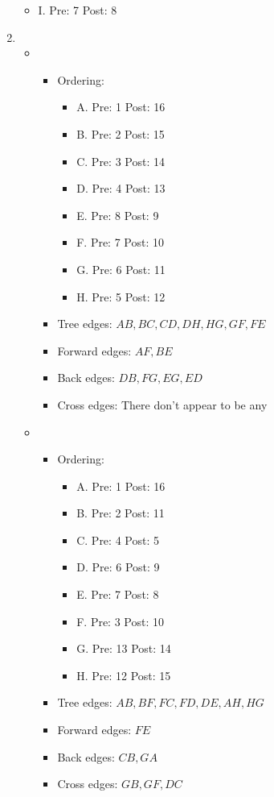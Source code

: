 \documentclass{article}
\begin{document}
\begin{enumerate}
\begin{itemize}
            \item I. Pre: 7 Post: 8
        \end{itemize}
        \item \begin{itemize}
            \item \begin{itemize}
                \item Ordering: \begin{itemize}
                \item A. Pre: 1 Post: 16
                \item B. Pre: 2 Post: 15
                \item C. Pre: 3 Post: 14
                \item D. Pre: 4 Post: 13
                \item E. Pre: 8 Post: 9 
                \item F. Pre: 7 Post: 10
                \item G. Pre: 6 Post: 11
                \item H. Pre: 5 Post: 12
                \end{itemize}
                \item Tree edges: $AB, BC, CD, DH, HG, GF, FE$
                \item Forward edges: $AF, BE$
                \item Back edges: $DB, FG, EG, ED$
                \item Cross edges: There don't appear to be any
            \end{itemize}
            \item \begin{itemize}
                \item Ordering: \begin{itemize}
                \item A. Pre: 1 Post: 16
                \item B. Pre: 2 Post: 11
                \item C. Pre: 4 Post: 5
                \item D. Pre: 6 Post: 9
                \item E. Pre: 7 Post: 8 
                \item F. Pre: 3 Post: 10
                \item G. Pre: 13 Post: 14
                \item H. Pre: 12 Post: 15
                \end{itemize}
                \item Tree edges: $AB, BF, FC, FD, DE, AH, HG$
                \item Forward edges: $FE$
                \item Back edges: $CB, GA$
                \item Cross edges: $GB, GF, DC$
            \end{itemize}
        \end{itemize}
    \end{enumerate}
\end{document}
